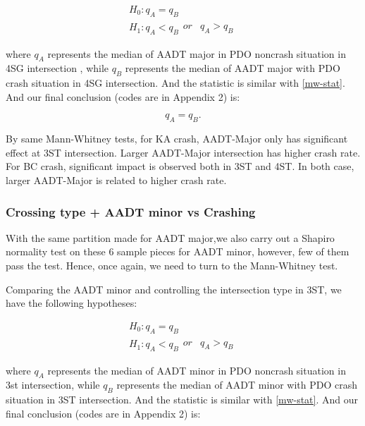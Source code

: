 \documentclass[11pt]{scrartcl} %
\begin{document}
\begin{equation*}
\begin{array}{l}
{H_0}:{q_A} = {q_B}\\
{H_1}:{q_A} < {q_B}\begin{array}{*{20}{c}}
{or}&{{q_A} > {q_B}}
\end{array}
\end{array}
\end{equation*}

where $q_A$ represents the median of AADT major in PDO noncrash situation in 4SG intersection , while $q_B$ represents the median of AADT major with PDO crash situation in 4SG intersection. And the statistic is similar with \eqref{mw-stat}. And our final conclusion (codes are in Appendix 2) is:

\begin{equation*}
{q_A} = {q_B}.
\end{equation*}

By same Mann-Whitney tests, for KA crash, AADT-Major only has significant effect at 3ST intersection. Larger AADT-Major intersection has higher crash rate. For BC crash, significant impact is observed both in 3ST and 4ST. In both case, larger AADT-Major is related to higher crash rate.

\subsubsection{Crossing type + AADT minor vs Crashing}

With the same partition made for AADT major,we also carry out a Shapiro normality test on these 6 sample pieces for AADT minor, however, few of them pass the test. Hence, once again, we need to turn to the Mann-Whitney test.

\par

Comparing the AADT minor and controlling the intersection type in 3ST, we have the following hypotheses:

\begin{equation*}
\begin{array}{l}
{H_0}:{q_A} = {q_B}\\
{H_1}:{q_A} < {q_B}\begin{array}{*{20}{c}}
{or}&{{q_A} > {q_B}}
\end{array}
\end{array}
\end{equation*}

where $q_A$ represents the median of AADT minor in PDO noncrash situation in 3st intersection, while $q_B$ represents the median of AADT minor with PDO crash situation in 3ST intersection. And the statistic is similar with \eqref{mw-stat}. And our final conclusion (codes are in Appendix 2) is:
\end{document}
